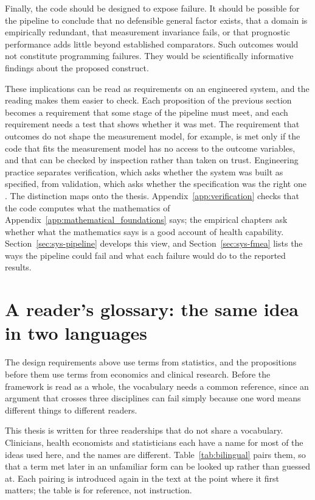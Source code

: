 Finally, the code should be designed to expose failure. It should be possible for the pipeline to conclude that no defensible general factor exists, that a domain is empirically redundant, that measurement invariance fails, or that prognostic performance adds little beyond established comparators. Such outcomes would not constitute programming failures. They would be scientifically informative findings about the proposed construct.

These implications can be read as requirements on an engineered system, and the reading makes them easier to check. Each proposition of the previous section becomes a requirement that some stage of the pipeline must meet, and each requirement needs a test that shows whether it was met. The requirement that outcomes do not shape the measurement model, for example, is met only if the code that fits the measurement model has no access to the outcome variables, and that can be checked by inspection rather than taken on trust. Engineering practice separates verification, which asks whether the system was built as specified, from validation, which asks whether the specification was the right one \citep{incose_2015}. The distinction maps onto the thesis. Appendix~\ref{app:verification} checks that the code computes what the mathematics of Appendix~\ref{app:mathematical_foundations} says; the empirical chapters ask whether what the mathematics says is a good account of health capability. Section~\ref{sec:sys-pipeline} develops this view, and Section~\ref{sec:sys-fmea} lists the ways the pipeline could fail and what each failure would do to the reported results.

\section{A reader's glossary: the same idea in two languages}
\label{sec:intro-glossary}

The design requirements above use terms from statistics, and the propositions before them use terms from economics and clinical research. Before the framework is read as a whole, the vocabulary needs a common reference, since an argument that crosses three disciplines can fail simply because one word means different things to different readers.

This thesis is written for three readerships that do not share a vocabulary.
Clinicians, health economists and statisticians each have a name for most of
the ideas used here, and the names are different. Table~\ref{tab:bilingual}
pairs them, so that a term met later in an unfamiliar form can be looked up
rather than guessed at. Each pairing is introduced again in the text at the
point where it first matters; the table is for reference, not instruction.

